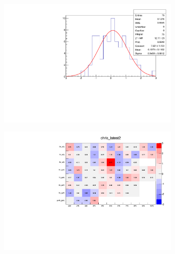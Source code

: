 \begin{figure}[h!]
  \centering
  \begin{subfigure}[b]{0.46\textwidth}
    \includegraphics[width=\textwidth]{Figs/results/v0/pulls/pull_per_bin.pdf}
    \caption{}
    \label{fig:pull_distro}
  \end{subfigure}
  \begin{subfigure}[b]{0.46\textwidth}
    \includegraphics[width=\textwidth]{Figs/results/v0/pulls/chris_latest2.pdf}
    \caption{}
    \label{fig:french_flag}
  \end{subfigure}\\
  \begin{subfigure}[b]{0.46\textwidth}

\end{subfigure}
\end{figure}
